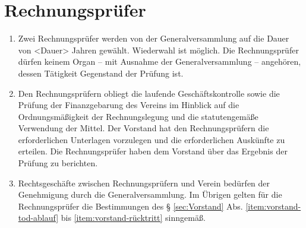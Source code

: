\documentclass[a4paper,12pt]{article}
\begin{document}
\section{Rechnungsprüfer} %
\label{sec:Rechnungspruefer}
\begin{enumerate}
\item Zwei Rechnungsprüfer werden von der Generalversammlung auf die Dauer von <Dauer> Jahren %
 gewählt. Wiederwahl ist möglich. Die Rechnungsprüfer dürfen keinem Organ – mit Ausnahme der Generalversammlung – angehören, dessen Tätigkeit Gegenstand der Prüfung ist.
\item Den Rechnungsprüfern obliegt die laufende Geschäftskontrolle sowie die Prüfung der Finanzgebarung des Vereins im Hinblick auf die Ordnungsmäßigkeit der Rechnungslegung und die statutengemäße Verwendung der Mittel. Der Vorstand hat den Rechnungsprüfern die erforderlichen Unterlagen vorzulegen und die erforderlichen Auskünfte zu erteilen. Die Rechnungsprüfer haben dem Vorstand über das Ergebnis der Prüfung zu berichten.

\item Rechtsgeschäfte zwischen Rechnungsprüfern und Verein bedürfen der Genehmigung durch die Generalversammlung. Im Übrigen gelten für die Rechnungsprüfer die Bestimmungen des § \ref{sec:Vorstand} Abs. \ref{item:vorstand-tod-ablauf} bis \ref{item:vorstand-rücktritt} sinngemäß.
\end{enumerate}
\end{document}
